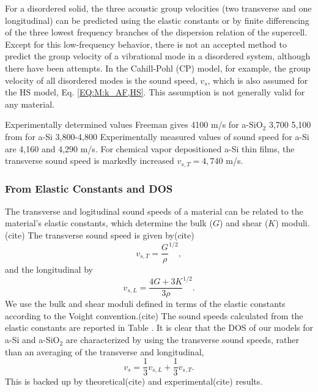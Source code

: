 \documentclass[aps,prb,twocolumn,superscriptaddress,footinbib,amsmath,amssymb,floatfix]{revtex4}
\begin{document}
For a disordered solid, the three acoustic group 
velocities (two transverse and one 
longitudinal) can be predicted using the elastic constants
\cite{gale_general_2003} 
or by finite differencing of the three lowest frequency branches 
of the dispersion relation of the supercell.
\cite{feldman_thermal_1993,feldman_numerical_1999,
donadio_atomistic_2009,he_thermal_2011,
he_heat_2011,hori_phonon_2013,larkin_predicting_2013} 
Except for this low-frequency behavior, there is not an 
accepted method to predict the group velocity of a 
vibrational mode in a disordered system, although there have been 
attempts.
\cite{cahill_lattice_1988,duda_reducing_2011,donadio_atomistic_2009,
he_heat_2011,he_thermal_2011} 
In the Cahill-Pohl (CP) model, for example, the group velocity of 
all disordered modes is the sound speed, $v_s$, which is also assumed  
for the HS model, Eq. \eqref{EQ:M:k_AF,HS}.
\cite{cahill_lattice_1988} This assumption is not generally valid  
for any material.\cite{feldman_numerical_1999,duda_reducing_2011,
donadio_atomistic_2009,he_heat_2011,he_thermal_2011,larkin_predicting_2013}

Experimentally determined values
Freeman gives 4100 m/s for a-SiO$_2$\cite{freeman_thermal_1986}
3,700 5,100 from \cite{pohl_low-temperature_2002}
for a-Si 3,800-4,800\cite{pohl_low-temperature_2002}
Experimentally measured values of sound speed for a-Si are 4,160
\cite{senn_physics_1979} and 
4,290 m/s\cite{vacher_attenuation_1980}.
\cite{feldman_elastic_1991} 
For chemical vapor depositioned a-Si thin films, the transverse 
sound speed is markedly increased $v_{s,T} = 4,740$ m/s.
\cite{liu_high_2009} 


\subsubsection{\label{S:Structure}From Elastic Constants and DOS}

The transverse and logitudinal sound speeds of a material can be related 
to the material's elastic constants, which determine the bulk ($G$) and 
shear ($K$) moduli.(cite) The transverse sound speed is given by(cite)  
\begin{equation}\label{EQ:Dynamical}
v_{s,T} = \frac{G}{\rho}^{1/2},
\end{equation}
and the longitudinal by
\begin{equation}\label{EQ:Dynamical}
v_{s,L} = \frac{4G + 3K}{3\rho}^{1/2}.
\end{equation}
We use the bulk and shear moduli defined in terms of the elastic 
constants according to the Voight convention.(cite) 
The sound speeds calculated from the 
elastic constants are reported in Table . It is clear that the DOS of 
our models for a-Si and a-SiO$_2$ are characterized by using the 
transverse sound speeds, rather than an averaging of the transverse 
and longitudinal, 
\begin{equation}\label{EQ:Dynamical}
v_{s} = \frac{1}{3}v_{s,L} + \frac{1}{3}v_{s,T}. 
\end{equation}
This is backed up by theoretical(cite) and experimental(cite) results. 
\end{document}
